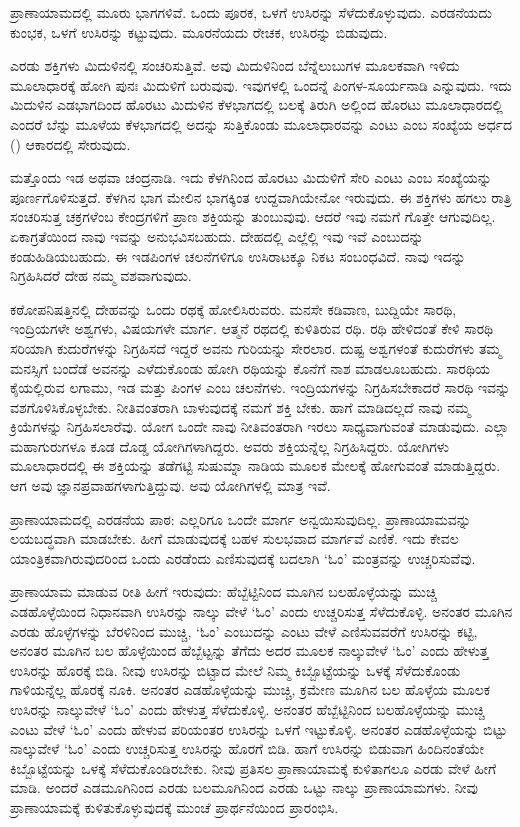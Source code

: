 ಪ್ರಾಣಾಯಾಮದಲ್ಲಿ ಮೂರು ಭಾಗಗಳಿವೆ. ಒಂದು ಪೂರಕ, ಒಳಗೆ ಉಸಿರನ್ನು ಸೆಳೆದುಕೊಳ್ಳುವುದು. ಎರಡನೆಯದು ಕುಂಭಕ, ಒಳಗೆ ಉಸಿರನ್ನು ಕಟ್ಟುವುದು. ಮೂರನೆಯದು ರೇಚಕ, ಉಸಿರನ್ನು ಬಿಡುವುದು.

ಎರಡು ಶಕ್ತಿಗಳು ಮಿದುಳಿನಲ್ಲಿ ಸಂಚರಿಸುತ್ತಿವೆ. ಅವು ಮಿದುಳಿನಿಂದ ಬೆನ್ನೆಲುಬುಗಳ ಮೂಲಕವಾಗಿ ಇಳಿದು ಮೂಲಾಧಾರಕ್ಕೆ ಹೋಗಿ ಪುನಃ ಮಿದುಳಿಗೆ ಬರುವುವು. ಇವುಗಳಲ್ಲಿ ಒಂದನ್ನೆ ಪಿಂಗಳ-ಸೂರ್ಯನಾಡಿ ಎನ್ನುವುದು. ಇದು ಮಿದುಳಿನ ಎಡಭಾಗದಿಂದ ಹೊರಟು ಮಿದುಳಿನ ಕೆಳಭಾಗದಲ್ಲಿ ಬಲಕ್ಕೆ ತಿರುಗಿ ಅಲ್ಲಿಂದ ಹೊರಟು ಮೂಲಾಧಾರದಲ್ಲಿ ಎಂದರೆ ಬೆನ್ನು ಮೂಳೆಯ ಕೆಳಭಾಗದಲ್ಲಿ ಅದನ್ನು ಸುತ್ತಿಕೊಂಡು ಮೂಲಾಧಾರವನ್ನು ಎಂಟು ಎಂಬ ಸಂಖ್ಯೆಯ ಅರ್ಧದ () ಆಕಾರದಲ್ಲಿ ಸೇರುವುದು.

ಮತ್ತೊಂದು ಇಡ ಅಥವಾ ಚಂದ್ರನಾಡಿ. ಇದು ಕೆಳಗಿನಿಂದ ಹೊರಟು ಮಿದುಳಿಗೆ ಸೇರಿ ಎಂಟು ಎಂಬ ಸಂಖ್ಯೆಯನ್ನು ಪೂರ್ಣಗೊಳಿಸುತ್ತದೆ. ಕೆಳಗಿನ ಭಾಗ ಮೇಲಿನ ಭಾಗಕ್ಕಿಂತ ಉದ್ದವಾಗಿಯೇನೋ ಇರುವುದು. ಈ ಶಕ್ತಿಗಳು ಹಗಲು ರಾತ್ರಿ ಸಂಚರಿಸುತ್ತ ಚಕ್ರಗಳೆಂಬ ಕೇಂದ್ರಗಳಿಗೆ ಪ್ರಾಣ ಶಕ್ತಿಯನ್ನು ತುಂಬುವುವು. ಆದರೆ ಇವು ನಮಗೆ ಗೊತ್ತೇ ಆಗುವುದಿಲ್ಲ. ಏಕಾಗ್ರತೆಯಿಂದ ನಾವು ಇವನ್ನು ಅನುಭವಿಸಬಹುದು. ದೇಹದಲ್ಲಿ ಎಲ್ಲೆಲ್ಲಿ ಇವು ಇವೆ ಎಂಬುದನ್ನು ಕಂಡುಹಿಡಿಯಬಹುದು. ಈ ಇಡಪಿಂಗಳ ಚಲನೆಗಳಿಗೂ ಉಸಿರಾಟಕ್ಕೂ ನಿಕಟ ಸಂಬಂಧವಿದೆ. ನಾವು ಇದನ್ನು ನಿಗ್ರಹಿಸಿದರೆ ದೇಹ ನಮ್ಮ ವಶವಾಗುವುದು.

ಕಠೋಪನಿಷತ್ತಿನಲ್ಲಿ ದೇಹವನ್ನು ಒಂದು ರಥಕ್ಕೆ ಹೋಲಿಸಿರುವರು. ಮನಸೇ ಕಡಿವಾಣ, ಬುದ್ದಿಯೇ ಸಾರಥಿ, ಇಂದ್ರಿಯಗಳೇ ಅಶ್ವಗಳು, ವಿಷಯಗಳೇ ಮಾರ್ಗ. ಆತ್ಮನೆ ರಥದಲ್ಲಿ ಕುಳಿತಿರುವ ರಥಿ. ರಥಿ ಹೇಳಿದಂತೆ ಕೇಳಿ ಸಾರಥಿ ಸರಿಯಾಗಿ ಕುದುರೆಗಳನ್ನು ನಿಗ್ರಹಿಸದೆ ಇದ್ದರೆ ಅವನು ಗುರಿಯನ್ನು ಸೇರಲಾರ. ದುಷ್ಟ ಅಶ್ವಗಳಂತೆ ಕುದುರೆಗಳು ತಮ್ಮ ಮನಸ್ಸಿಗೆ ಬಂದೆಡೆ ಅವನನ್ನು ಎಳೆದುಕೊಂಡು ಹೋಗಿ ರಥಿಯನ್ನು ಕೊನೆಗೆ ನಾಶ ಮಾಡಲೂಬಹುದು. ಸಾರಥಿಯ ಕೈಯಲ್ಲಿರುವ ಲಗಾಮು, ಇಡ ಮತ್ತು ಪಿಂಗಳ ಎಂಬ ಚಲನೆಗಳು. ಇಂದ್ರಿಯಗಳನ್ನು ನಿಗ್ರಹಿಸಬೇಕಾದರೆ ಸಾರಥಿ ಇವನ್ನು ವಶಗೊಳಿಸಿಕೊಳ್ಳಬೇಕು. ನೀತಿವಂತರಾಗಿ ಬಾಳುವುದಕ್ಕೆ ನಮಗೆ ಶಕ್ತಿ ಬೇಕು. ಹಾಗೆ ಮಾಡಿದಲ್ಲದೆ ನಾವು ನಮ್ಮ ಕ್ರಿಯೆಗಳನ್ನು ನಿಗ್ರಹಿಸಲಾರೆವು. ಯೋಗ ಒಂದೇ ನಾವು ನೀತಿವಂತರಾಗಿ ಇರಲು ಸಾಧ್ಯವಾಗುವಂತೆ ಮಾಡುವುದು. ಎಲ್ಲಾ ಮಹಾಗುರುಗಳೂ ಕೂಡ ದೊಡ್ಡ ಯೋಗಿಗಳಾಗಿದ್ದರು. ಅವರು ಶಕ್ತಿಯನ್ನೆಲ್ಲ ನಿಗ್ರಹಿಸಿದ್ದರು. ಯೋಗಿಗಳು ಮೂಲಾಧಾರದಲ್ಲಿ ಈ ಶಕ್ತಿಯನ್ನು ತಡೆಗಟ್ಟಿ ಸುಷುಮ್ನಾ ನಾಡಿಯ ಮೂಲಕ ಮೇಲಕ್ಕೆ ಹೋಗುವಂತೆ ಮಾಡುತ್ತಿದ್ದರು. ಆಗ ಅವು ಜ್ಞಾನಪ್ರವಾಹಗಳಾಗುತ್ತಿದ್ದುವು. ಅವು ಯೋಗಿಗಳಲ್ಲಿ ಮಾತ್ರ ಇವೆ.

ಪ್ರಾಣಾಯಾಮದಲ್ಲಿ ಎರಡನೆಯ ಪಾಠ: ಎಲ್ಲರಿಗೂ ಒಂದೇ ಮಾರ್ಗ ಅನ್ವಯಿಸುವುದಿಲ್ಲ. ಪ್ರಾಣಾಯಾಮವನ್ನು ಲಯಬದ್ಧವಾಗಿ ಮಾಡಬೇಕು. ಹೀಗೆ ಮಾಡುವುದಕ್ಕೆ ಬಹಳ ಸುಲಭವಾದ ಮಾರ್ಗವೆ ಎಣಿಕೆ. ಇದು ಕೇವಲ ಯಾಂತ್ರಿಕವಾಗಿರುವುದರಿಂದ ಒಂದು ಎರಡೆಂದು ಎಣಿಸುವುದಕ್ಕೆ ಬದಲಾಗಿ `ಓಂ' ಮಂತ್ರವನ್ನು ಉಚ್ಚರಿಸುವೆವು.

ಪ್ರಾಣಾಯಾಮ ಮಾಡುವ ರೀತಿ ಹೀಗೆ ಇರುವುದು: ಹೆಬ್ಬೆಟ್ಟಿನಿಂದ ಮೂಗಿನ ಬಲಹೊಳ್ಳೆಯನ್ನು ಮುಚ್ಚಿ ಎಡಹೊಳ್ಳೆಯಿಂದ ನಿಧಾನವಾಗಿ ಉಸಿರನ್ನು ನಾಲ್ಕು ವೇಳೆ `ಓಂ' ಎಂದು ಉಚ್ಚರಿಸುತ್ತ ಸೆಳೆದುಕೊಳ್ಳಿ. ಅನಂತರ ಮೂಗಿನ ಎರಡು ಹೊಳ್ಳೆಗಳನ್ನು ಬೆರಳಿನಿಂದ ಮುಚ್ಚಿ, `ಓಂ' ಎಂಬುದನ್ನು ಎಂಟು ವೇಳೆ ಎಣಿಸುವವರೆಗೆ ಉಸಿರನ್ನು ಕಟ್ಟಿ, ಅನಂತರ ಮೂಗಿನ ಬಲ ಹೊಳ್ಳೆಯಿಂದ ಹೆಬ್ಬೆಟ್ಟನ್ನು ತೆಗೆದು ಅದರ ಮೂಲಕ ನಾಲ್ಕುವೇಳೆ `ಓಂ' ಎಂದು ಹೇಳುತ್ತ ಉಸಿರನ್ನು ಹೊರಕ್ಕೆ ಬಿಡಿ. ನೀವು ಉಸಿರನ್ನು ಬಿಟ್ಟಾದ ಮೇಲೆ ನಿಮ್ಮ ಕಿಬ್ಬೊಟ್ಟೆಯನ್ನು ಒಳಕ್ಕೆ ಸೆಳೆದುಕೊಂಡು ಗಾಳಿಯನ್ನೆಲ್ಲ ಹೊರಕ್ಕೆ ನೂಕಿ. ಅನಂತರ ಎಡಹೊಳ್ಳೆಯನ್ನು ಮುಚ್ಚಿ, ಕ್ರಮೇಣ ಮೂಗಿನ ಬಲ ಹೊಳ್ಳೆಯ ಮೂಲಕ ಉಸಿರನ್ನು ನಾಲ್ಕುವೇಳೆ `ಓಂ' ಎಂದು ಹೇಳುತ್ತ ಸೆಳೆದುಕೊಳ್ಳಿ. ಅನಂತರ ಹೆಬ್ಬೆಟ್ಟಿನಿಂದ ಬಲಹೊಳ್ಳೆಯನ್ನು ಮುಚ್ಚಿ ಎಂಟು ವೇಳೆ `ಓಂ' ಎಂದು ಹೇಳುವ ಪರಿಯಂತರ ಉಸಿರನ್ನು ಒಳಗೆ ಇಟ್ಟುಕೊಳ್ಳಿ. ಅನಂತರ ಎಡಹೊಳ್ಳೆಯನ್ನು ಬಿಟ್ಟು ನಾಲ್ಕುವೇಳೆ `ಓಂ' ಎಂದು ಉಚ್ಚರಿಸುತ್ತ ಉಸಿರನ್ನು ಹೊರಗೆ ಬಿಡಿ. ಹಾಗೆ ಉಸಿರನ್ನು ಬಿಡುವಾಗ ಹಿಂದಿನಂತೆಯೇ ಕಿಬ್ಬೊಟ್ಟೆಯನ್ನು ಒಳಕ್ಕೆ ಸೆಳೆದುಕೊಂಡಿರಬೇಕು. ನೀವು ಪ್ರತಿಸಲ ಪ್ರಾಣಾಯಾಮಕ್ಕೆ ಕುಳಿತಾಗಲೂ ಎರಡು ವೇಳೆ ಹೀಗೆ ಮಾಡಿ. ಅಂದರೆ ಎಡಮೂಗಿನಿಂದ ಎರಡು ಬಲಮೂಗಿನಿಂದ ಎರಡು ಒಟ್ಟು ನಾಲ್ಕು ಪ್ರಾಣಾಯಾಮಗಳು. ನೀವು ಪ್ರಾಣಾಯಾಮಕ್ಕೆ ಕುಳಿತುಕೊಳ್ಳುವುದಕ್ಕೆ ಮುಂಚೆ ಪ್ರಾರ್ಥನೆಯಿಂದ ಪ್ರಾರಂಭಿಸಿ.

